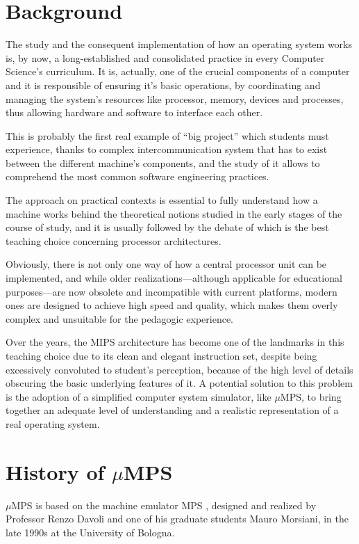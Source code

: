 \documentclass[12pt,a4paper,openright,twoside]{report}
\begin{document}
\section{Background}
	The study and the consequent implementation of how an operating system works is, by now, a long-established and consolidated practice in every Computer Science's curriculum.
	It is, actually, one of the crucial components of a computer and it is responsible of ensuring it's basic operations, by coordinating and managing the system's resources like processor, memory, devices and processes, thus allowing hardware and software to interface each other.
	
	This is probably the first real example of ``big project'' which students must experience, thanks to complex intercommunication system that has to exist between the different machine's components, and the study of it allows to comprehend the most common software engineering practices.
	
	The approach on practical contexts is essential to fully understand how a machine works behind the theoretical notions studied in the early stages of the course of study, and it is usually followed by the debate of which is the best teaching choice concerning processor architectures.
	
	Obviously, there is not only one way of how a central processor unit can be implemented, and while older realizations---although applicable for educational purposes---are now obsolete and incompatible with current platforms, modern ones are designed to achieve high speed and quality, which makes them overly complex and unsuitable for the pedagogic experience.
	
	Over the years, the MIPS architecture has become one of the landmarks in this teaching choice due to its clean and elegant instruction set, despite being excessively convoluted to student’s perception, because of the high level of details obscuring the basic underlying features of it.
	A potential solution to this problem is the adoption of a simplified computer system simulator, like $\mu$MPS, to bring together an adequate level of understanding and a realistic representation of a real operating system.

\section{History of $\mu$MPS}
	$\mu$MPS is based on the machine emulator MPS \cite{mps}, designed and realized by Professor Renzo Davoli and one of his graduate students Mauro Morsiani, in the late 1990s at the University of Bologna.
	
\end{document}
